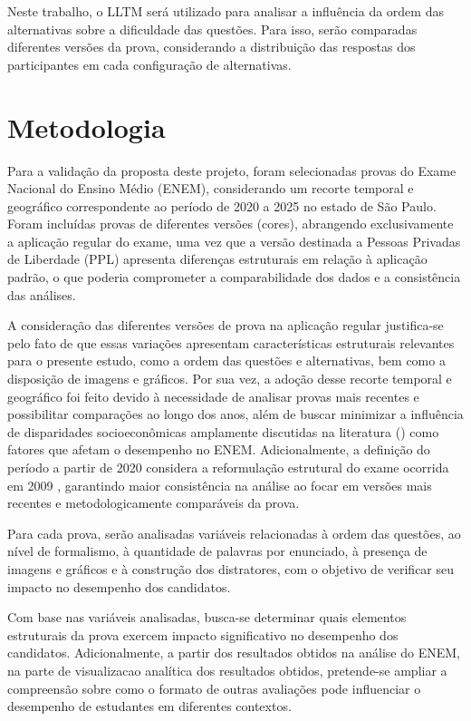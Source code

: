 \documentclass[a4paper,10pt, twocolumn]{article}
\begin{document}
Neste trabalho, o LLTM será utilizado para analisar a influência da ordem das alternativas sobre a dificuldade das questões. Para isso, serão comparadas diferentes versões da prova, considerando a distribuição das respostas dos participantes em cada configuração de alternativas.


\section{Metodologia}

Para a validação da proposta deste projeto, foram selecionadas provas do Exame Nacional do Ensino Médio (ENEM), considerando um recorte temporal e geográfico correspondente ao período de 2020 a 2025 no estado de São Paulo. Foram incluídas provas de diferentes versões (cores), abrangendo exclusivamente a aplicação regular do exame, uma vez que a versão destinada a Pessoas Privadas de Liberdade (PPL) apresenta diferenças estruturais em relação à aplicação padrão, o que poderia comprometer a comparabilidade dos dados e a consistência das análises.

A consideração das diferentes versões de prova na aplicação regular justifica-se pelo fato de que essas variações apresentam características estruturais relevantes para o presente estudo, como a ordem das questões e alternativas, bem como a disposição de imagens e gráficos. Por sua vez, a adoção desse recorte temporal e geográfico foi feito devido à necessidade de analisar provas mais recentes e possibilitar comparações ao longo dos anos, além de buscar minimizar a influência de disparidades socioeconômicas amplamente discutidas na literatura (\textcite{Dutra2023}) como fatores que afetam o desempenho no ENEM. Adicionalmente, a definição do período a partir de 2020 considera a reformulação estrutural do exame ocorrida em 2009  \cite{Inep_2020}, garantindo maior consistência na análise ao focar em versões mais recentes e metodologicamente comparáveis da prova.

Para cada prova, serão analisadas variáveis relacionadas à ordem das questões, ao nível de formalismo, à quantidade de palavras por enunciado, à presença de imagens e gráficos e à construção dos distratores, com o objetivo de verificar seu impacto no desempenho dos candidatos.

Com base nas variáveis analisadas, busca-se determinar quais elementos estruturais da prova exercem impacto significativo no desempenho dos candidatos. Adicionalmente, a partir dos resultados obtidos na análise do ENEM, na parte de visualizacao analítica dos resultados obtidos, pretende-se ampliar a compreensão sobre como o formato de outras avaliações pode influenciar o desempenho de estudantes em diferentes contextos.
\end{document}
